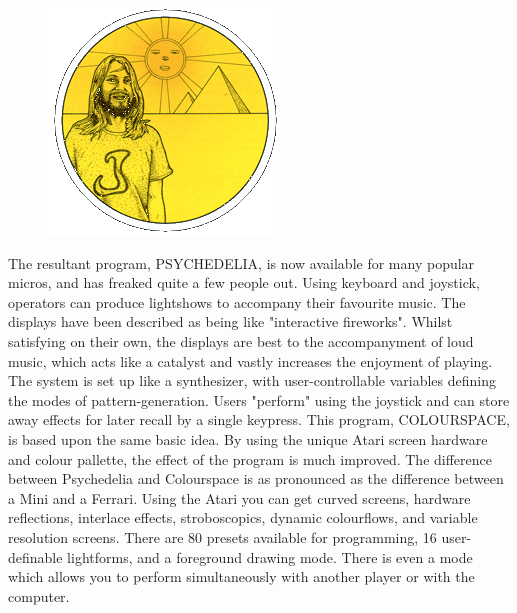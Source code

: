 \begin{definition}
\setlength{\intextsep}{0pt}%
\setlength{\columnsep}{3pt}%
\begin{figure}
\includegraphics[width=\linewidth]{src/callout/psych.png} 
\end{figure}
\small
The resultant program, PSYCHEDELIA, is now available for many popular micros,
and has freaked quite a few people out.  Using keyboard and joystick, operators
can produce lightshows to accompany their favourite music.  The displays have
been described as being like "interactive fireworks".  Whilst satisfying on
their own, the displays are best to the accompanyment of loud music, which acts
like a catalyst and vastly increases the enjoyment of playing.  The system is
set up like a synthesizer, with user-controllable variables defining the modes
of pattern-generation.  Users "perform" using the joystick and can store away
effects for later recall by a single keypress.
This program, COLOURSPACE, is based upon the same basic idea.  By using the
unique Atari screen hardware and colour pallette, the effect of the program is
much improved.  The difference between Psychedelia and Colourspace is as
pronounced as the difference between a Mini and a Ferrari.  Using the Atari you
can get curved screens, hardware reflections, interlace effects, stroboscopics,
dynamic colourflows, and variable resolution screens.  There are 80 presets
available for programming, 16 user-definable lightforms, and a foreground
drawing mode.  There is even a mode which allows you to perform simultaneously
with another player or with the computer.
\end{definition}


